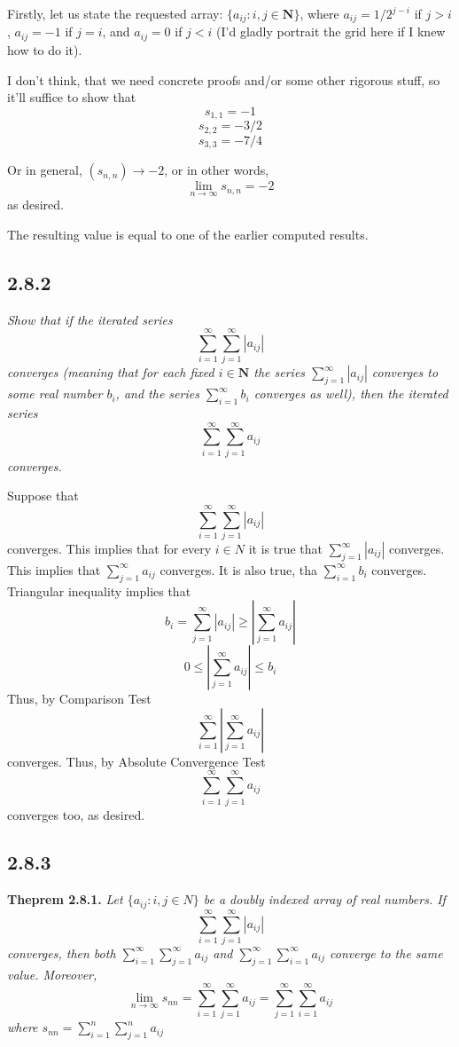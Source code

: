 \documentclass[11pt,oneside,titlepage]{book}
\begin{document}
Firstly, let us state the requested array:  $\{a_{ij}: i,j \in \textbf{N}\}$,
where $a_{ij} = 1/2^{j - i}$ if $j > i$, $a_{ij} = -1$ if $j = i$, and
$a_{ij} = 0$ if $j < i$ (I'd gladly portrait the grid here if I knew how to
do it).

I don't think, that we need concrete proofs and/or some other rigorous stuff,
so it'll suffice to show that
$$s_{1,1} = -1$$
$$s_{2,2} = -3/2$$
$$s_{3,3} = -7/4$$

Or in general, $(s_{n,n}) \to  -2$, or in other words,
$$\lim_{n \to \infty} s_{n,n} = -2$$
as desired.

The resulting value is equal to one of the earlier computed results.

\subsection*{2.8.2}

\textit{Show that if the iterated series }
$$\sum_{i = 1}^{\infty}\sum_{j = 1}^{\infty}|a_{ij}|$$
\textit{converges (meaning that for each fixed $i \in \textbf{N}$ the series
  $\sum_{j = 1}^{\infty}|a_{ij}|$ converges to some real number $b_i$, and
  the series $\sum_{i = 1}^{\infty}b_i$ converges as well), then the iterated
  series}
$$\sum_{i = 1}^{\infty}\sum_{j = 1}^{\infty}a_{ij}$$
\textit{converges.}

Suppose that
$$\sum_{i = 1}^{\infty}\sum_{j = 1}^{\infty}|a_{ij}|$$
converges. This implies that for every $i \in N$ it is true that
$\sum_{j = 1}^{\infty}|a_{ij}|$  converges. This implies that
$\sum_{j = 1}^{\infty}a_{ij}$ converges. It is also true, tha
$\sum_{i = 1}^{\infty}b_{i}$ converges. Triangular inequality implies that
$$ b_i =  \sum_{j = 1}^{\infty}|a_{ij}| \geq \left|\sum_{j = 1}^{\infty}a_{ij}\right|$$
$$  0 \leq \left|\sum_{j = 1}^{\infty}a_{ij}\right| \leq b_i$$
Thus, by Comparison Test
$$\sum_{i = 1}^{\infty}\left|\sum_{j = 1}^{\infty}a_{ij}\right|$$
converges. Thus, by Absolute Convergence Test
$$\sum_{i = 1}^{\infty}\sum_{j = 1}^{\infty}a_{ij}$$
converges too, as desired.



\subsection*{2.8.3}

\textbf{Theprem 2.8.1.}
\textit{Let $\{a_{ij}: i, j \in N\}$ be a doubly indexed array of real numbers.
If}
$$\sum_{i = 1}^{\infty}\sum_{j = 1}^{\infty}|a_{ij}|$$
\textit{converges, then both
  $\sum_{i = 1}^{\infty}\sum_{j = 1}^{\infty} a_{ij}$ and
  $\sum_{j = 1}^{\infty}\sum_{i = 1}^{\infty} a_{ij}$ converge to the same value. Moreover, }
$$\lim_{n \to \infty} s_{nn} = \sum_{i = 1}^{\infty}\sum_{j = 1}^{\infty}a_{ij} = \sum_{j = 1}^{\infty}\sum_{i = 1}^{\infty}a_{ij}$$
\textit{where $s_{nn} = \sum_{i = 1}^{n}\sum_{j = 1}^{n}a_{ij}$}
\end{document}
